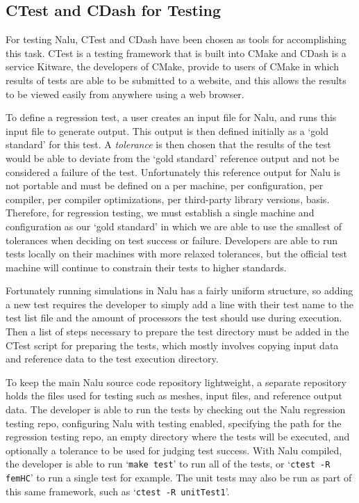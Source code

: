 \documentclass[12pt, oneside]{article}
\begin{document}
\subsection{CTest and CDash for Testing}

For testing Nalu, CTest and CDash have been chosen as tools for accomplishing this task. CTest is a testing framework that is built into CMake and CDash is a service Kitware, the developers of CMake, provide to users of CMake in which results of tests are able to be submitted to a website, and this allows the results to be viewed easily from anywhere using a web browser.

To define a regression test, a user creates an input file for Nalu, and runs this input file to generate output. This output is then defined initially as a `gold standard' for this test. A \textit{tolerance} is then chosen that the results of the test would be able to deviate from the `gold standard' reference output and not be considered a failure of the test. Unfortunately this reference output for Nalu is not portable and must be defined on a per machine, per configuration, per compiler, per compiler optimizations, per third-party library versions, basis. Therefore, for regression testing, we must establish a single machine and configuration as our `gold standard' in which we are able to use the smallest of tolerances when deciding on test success or failure. Developers are able to run tests locally on their machines with more relaxed tolerances, but the official test machine will continue to constrain their tests to higher standards.

Fortunately running simulations in Nalu has a fairly uniform structure, so adding a new test requires the developer to simply add a line with their test name to the test list file and the amount of processors the test should use during execution. Then a list of steps necessary to prepare the test directory must be added in the CTest script for preparing the tests, which mostly involves copying input data and reference data to the test execution directory.

To keep the main Nalu source code repository lightweight, a separate repository holds the files used for testing such as meshes, input files, and reference output data. The developer is able to run the tests by checking out the Nalu regression testing repo, configuring Nalu with testing enabled, specifying the path for the regression testing repo, an empty directory where the tests will be executed, and optionally a tolerance to be used for judging test success. With Nalu compiled, the developer is able to run `\texttt{make test}' to run all of the tests, or `\texttt{ctest -R femHC}' to run a single test for example. The unit tests may also be run as part of this same framework, such as `\texttt{ctest -R unitTest1}'.
\end{document}
